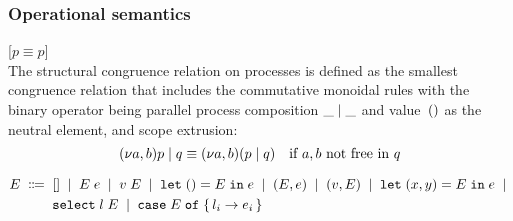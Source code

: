 


\subsubsection{Operational semantics}

[$p \equiv p$]\medskip\\
The structural congruence relation on processes is defined as the smallest
congruence relation that includes the commutative monoidal rules with the
binary operator being parallel process composition $\PPar \_ \_$ and
value~$()$ as the neutral element, and scope extrusion:
\[
  \PPar{\PScope p}{q} \equiv \PScope (\PPar p q)
  \quad
  \text{if $a,b$ not free in $q$}
\]

\begin{align*}
  E \; \Coloneqq \;\;&
    [] \; \mid \;
    E \; e \; \mid \;
    v \; E \; \mid \;
    \mathtt{let}\; () = E \;\mathtt{in}\; e \; \mid \;
    (E,e) \; \mid \;
    (v,E) \; \mid \;
    \mathtt{let}\; (x,y) = E \;\mathtt{in}\; e \; \mid \;
  \\ &
    \mathtt{select}\; l \; E \; \mid \; 
    \mathtt{case}\; E \; \mathtt{of} \; \{\,  l_i \rightarrow e_i  \,\}
\end{align*}



